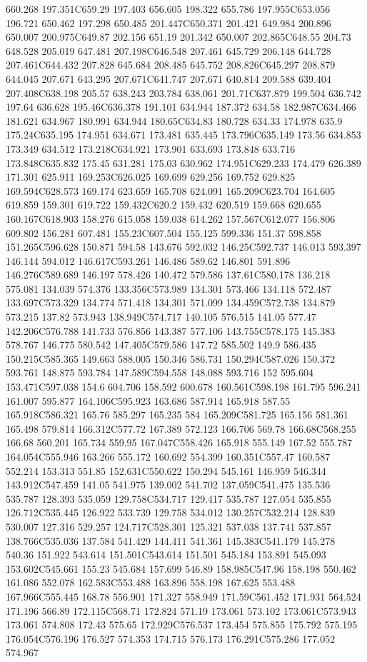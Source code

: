 660.268 197.351C659.29 197.403 656.605 198.322 655.786 197.955C653.056 196.721 650.462 197.298 650.485 201.447C650.371 201.421 649.984 200.896 650.007 200.975C649.87 202.156 651.19 201.342 650.007 202.865C648.55 204.73 648.528 205.019 647.481 207.198C646.548 207.461 645.729 206.148 644.728 207.461C644.432 207.828 645.684 208.485 645.752 208.826C645.297 208.879 644.045 207.671 643.295 207.671C641.747 207.671 640.814 209.588 639.404 207.408C638.198 205.57 638.243 203.784 638.061 201.71C637.879 199.504 636.742 197.64 636.628 195.46C636.378 191.101 634.944 187.372 634.58 182.987C634.466 181.621 634.967 180.991 634.944 180.65C634.83 180.728 634.33 174.978 635.9 175.24C635.195 174.951 634.671 173.481 635.445 173.796C635.149 173.56 634.853 173.349 634.512 173.218C634.921 173.901 633.693 173.848 633.716 173.848C635.832 175.45 631.281 175.03 630.962 174.951C629.233 174.479 626.389 171.301 625.911 169.253C626.025 169.699 629.256 169.752 629.825 169.594C628.573 169.174 623.659 165.708 624.091 165.209C623.704 164.605 619.859 159.301 619.722 159.432C620.2 159.432 620.519 159.668 620.655 160.167C618.903 158.276 615.058 159.038 614.262 157.567C612.077 156.806 609.802 156.281 607.481 155.23C607.504 155.125 599.336 151.37 598.858 151.265C596.628 150.871 594.58 143.676 592.032 146.25C592.737 146.013 593.397 146.144 594.012 146.617C593.261 146.486 589.62 146.801 591.896 146.276C589.689 146.197 578.426 140.472 579.586 137.61C580.178 136.218 575.081 134.039 574.376 133.356C573.989 134.301 573.466 134.118 572.487 133.697C573.329 134.774 571.418 134.301 571.099 134.459C572.738 134.879 573.215 137.82 573.943 138.949C574.717 140.105 576.515 141.05 577.47 142.206C576.788 141.733 576.856 143.387 577.106 143.755C578.175 145.383 578.767 146.775 580.542 147.405C579.586 147.72 585.502 149.9 586.435 150.215C585.365 149.663 588.005 150.346 586.731 150.294C587.026 150.372 593.761 148.875 593.784 147.589C594.558 148.088 593.716 152 595.604 153.471C597.038 154.6 604.706 158.592 600.678 160.561C598.198 161.795 596.241 161.007 595.877 164.106C595.923 163.686 587.914 165.918 587.55 165.918C586.321 165.76 585.297 165.235 584 165.209C581.725 165.156 581.361 165.498 579.814 166.312C577.72 167.389 572.123 166.706 569.78 166.68C568.255 166.68 560.201 165.734 559.95 167.047C558.426 165.918 555.149 167.52 555.787 164.054C555.946 163.266 555.172 160.692 554.399 160.351C557.47 160.587 552.214 153.313 551.85 152.631C550.622 150.294 545.161 146.959 546.344 143.912C547.459 141.05 541.975 139.002 541.702 137.059C541.475 135.536 535.787 128.393 535.059 129.758C534.717 129.417 535.787 127.054 535.855 126.712C535.445 126.922 533.739 129.758 534.012 130.257C532.214 128.839 530.007 127.316 529.257 124.717C528.301 125.321 537.038 137.741 537.857 138.766C535.036 137.584 541.429 144.411 541.361 145.383C541.179 145.278 540.36 151.922 543.614 151.501C543.614 151.501 545.184 153.891 545.093 153.602C545.661 155.23 545.684 157.699 546.89 158.985C547.96 158.198 550.462 161.086 552.078 162.583C553.488 163.896 558.198 167.625 553.488 167.966C555.445 168.78 556.901 171.327 558.949 171.59C561.452 171.931 564.524 171.196 566.89 172.115C568.71 172.824 571.19 173.061 573.102 173.061C573.943 173.061 574.808 172.43 575.65 172.929C576.537 173.454 575.855 175.792 575.195 176.054C576.196 176.527 574.353 174.715 576.173 176.291C575.286 177.052 574.967 